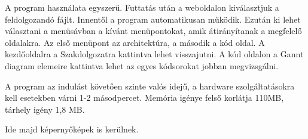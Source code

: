 
A program használata egyszerű. Futtatás után a weboldalon kiválasztjuk a feldolgozandó fájlt. Innentől a program automatikusan működik. Ezután ki lehet választani a menüsávban a kívánt menüpontokat, amik átirányítanak a megfelelő oldalakra. Az első menüpont az architektúra, a második a kód oldal. A kezdőoldalra a Szakdolgozatra kattintva lehet visszajutni. A kód oldalon a Gannt diagram elemeire kattintva lehet az egyes kódsorokat jobban megvizsgálni.

A program az indulást követően szinte valós idejű, a hardware szolgáltatásokra kell esetekben várni 1-2 másodpercet. Memória igénye felső korlátja 110MB, tárhely igény 1,8 MB.

Ide majd képernyőképek is kerülnek.



